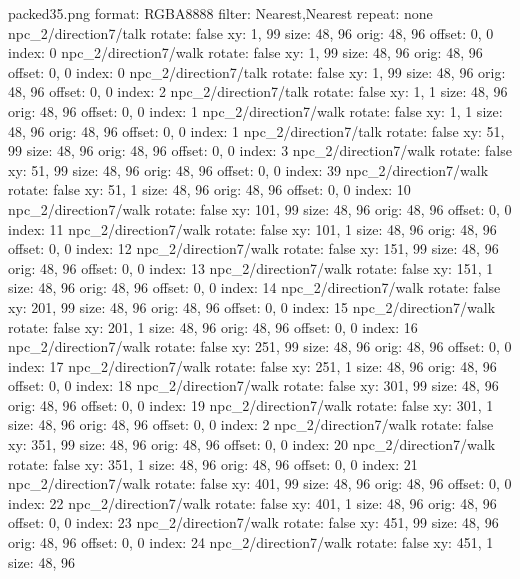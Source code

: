 packed35.png
format: RGBA8888
filter: Nearest,Nearest
repeat: none
npc_2/direction7/talk
  rotate: false
  xy: 1, 99
  size: 48, 96
  orig: 48, 96
  offset: 0, 0
  index: 0
npc_2/direction7/walk
  rotate: false
  xy: 1, 99
  size: 48, 96
  orig: 48, 96
  offset: 0, 0
  index: 0
npc_2/direction7/talk
  rotate: false
  xy: 1, 99
  size: 48, 96
  orig: 48, 96
  offset: 0, 0
  index: 2
npc_2/direction7/talk
  rotate: false
  xy: 1, 1
  size: 48, 96
  orig: 48, 96
  offset: 0, 0
  index: 1
npc_2/direction7/walk
  rotate: false
  xy: 1, 1
  size: 48, 96
  orig: 48, 96
  offset: 0, 0
  index: 1
npc_2/direction7/talk
  rotate: false
  xy: 51, 99
  size: 48, 96
  orig: 48, 96
  offset: 0, 0
  index: 3
npc_2/direction7/walk
  rotate: false
  xy: 51, 99
  size: 48, 96
  orig: 48, 96
  offset: 0, 0
  index: 39
npc_2/direction7/walk
  rotate: false
  xy: 51, 1
  size: 48, 96
  orig: 48, 96
  offset: 0, 0
  index: 10
npc_2/direction7/walk
  rotate: false
  xy: 101, 99
  size: 48, 96
  orig: 48, 96
  offset: 0, 0
  index: 11
npc_2/direction7/walk
  rotate: false
  xy: 101, 1
  size: 48, 96
  orig: 48, 96
  offset: 0, 0
  index: 12
npc_2/direction7/walk
  rotate: false
  xy: 151, 99
  size: 48, 96
  orig: 48, 96
  offset: 0, 0
  index: 13
npc_2/direction7/walk
  rotate: false
  xy: 151, 1
  size: 48, 96
  orig: 48, 96
  offset: 0, 0
  index: 14
npc_2/direction7/walk
  rotate: false
  xy: 201, 99
  size: 48, 96
  orig: 48, 96
  offset: 0, 0
  index: 15
npc_2/direction7/walk
  rotate: false
  xy: 201, 1
  size: 48, 96
  orig: 48, 96
  offset: 0, 0
  index: 16
npc_2/direction7/walk
  rotate: false
  xy: 251, 99
  size: 48, 96
  orig: 48, 96
  offset: 0, 0
  index: 17
npc_2/direction7/walk
  rotate: false
  xy: 251, 1
  size: 48, 96
  orig: 48, 96
  offset: 0, 0
  index: 18
npc_2/direction7/walk
  rotate: false
  xy: 301, 99
  size: 48, 96
  orig: 48, 96
  offset: 0, 0
  index: 19
npc_2/direction7/walk
  rotate: false
  xy: 301, 1
  size: 48, 96
  orig: 48, 96
  offset: 0, 0
  index: 2
npc_2/direction7/walk
  rotate: false
  xy: 351, 99
  size: 48, 96
  orig: 48, 96
  offset: 0, 0
  index: 20
npc_2/direction7/walk
  rotate: false
  xy: 351, 1
  size: 48, 96
  orig: 48, 96
  offset: 0, 0
  index: 21
npc_2/direction7/walk
  rotate: false
  xy: 401, 99
  size: 48, 96
  orig: 48, 96
  offset: 0, 0
  index: 22
npc_2/direction7/walk
  rotate: false
  xy: 401, 1
  size: 48, 96
  orig: 48, 96
  offset: 0, 0
  index: 23
npc_2/direction7/walk
  rotate: false
  xy: 451, 99
  size: 48, 96
  orig: 48, 96
  offset: 0, 0
  index: 24
npc_2/direction7/walk
  rotate: false
  xy: 451, 1
  size: 48, 96
